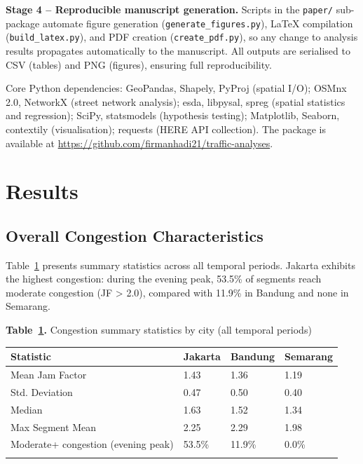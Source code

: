 \documentclass[12pt,a4paper]{article}
\begin{document}
\textbf{Stage 4 -- Reproducible manuscript generation.} Scripts in the \texttt{paper/} sub-package automate figure generation (\texttt{generate\_figures.py}), LaTeX compilation (\texttt{build\_latex.py}), and PDF creation (\texttt{create\_pdf.py}), so any change to analysis results propagates automatically to the manuscript. All outputs are serialised to CSV (tables) and PNG (figures), ensuring full reproducibility.

Core Python dependencies: GeoPandas, Shapely, PyProj (spatial I/O); OSMnx 2.0, NetworkX (street network analysis); esda, libpysal, spreg (spatial statistics and regression); SciPy, statsmodels (hypothesis testing); Matplotlib, Seaborn, contextily (visualisation); requests (HERE API collection). The package is available at \url{https://github.com/firmanhadi21/traffic-analyses}.



\section{Results}

\subsection{Overall Congestion Characteristics}

Table~\ref{tab:table5_congestion} presents summary statistics across all temporal periods. Jakarta exhibits the highest congestion: during the evening peak, 53.5\% of segments reach moderate congestion (JF > 2.0), compared with 11.9\% in Bandung and none in Semarang.

\textbf{Table~\ref{tab:table5_congestion}.} Congestion summary statistics by city (all temporal periods)

\begin{longtable}[]{@{}llll@{}}
\toprule\noalign{}
Statistic & Jakarta & Bandung & Semarang \\
\midrule\noalign{}
\endhead
\bottomrule\noalign{}
\endlastfoot
Mean Jam Factor & 1.43 & 1.36 & 1.19 \\
Std. Deviation & 0.47 & 0.50 & 0.40 \\
Median & 1.63 & 1.52 & 1.34 \\
Max Segment Mean & 2.25 & 2.29 & 1.98 \\
Moderate+ congestion (evening peak) & 53.5\% & 11.9\% & 0.0\% \\
\label{tab:table5_congestion}
\end{longtable}
\end{document}
